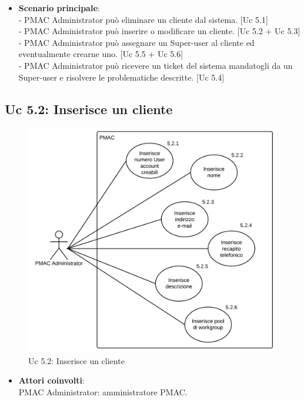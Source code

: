 {\begin{itemize}
\item \textbf{Scenario principale}:\\
- PMAC Administrator può eliminare un cliente dal sistema. [Uc 5.1]\\
- PMAC Administrator può inserire o modificare un cliente. [Uc 5.2 + Uc 5.3]\\
- PMAC Administrator può assegnare un Super-user al cliente ed eventualmente crearne uno. [Uc 5.5 + Uc 5.6]\\
- PMAC Administrator può ricevere un ticket del sistema mandatogli da un Super-user e risolvere le problematiche descritte. [Uc 5.4]
\end{itemize}


\subsection{Uc 5.2: Inserisce un cliente}
\begin{figure}[ht]
\centering
\caption{Uc 5.2: Inserisce un cliente}
\includegraphics[scale=0.9]{images/cap1/UseCase/Uc5_2} %
\end{figure}

\begin{itemize}
\item \textbf{Attori coinvolti}:\\
PMAC Administrator: amministratore PMAC.


\end{itemize}}
